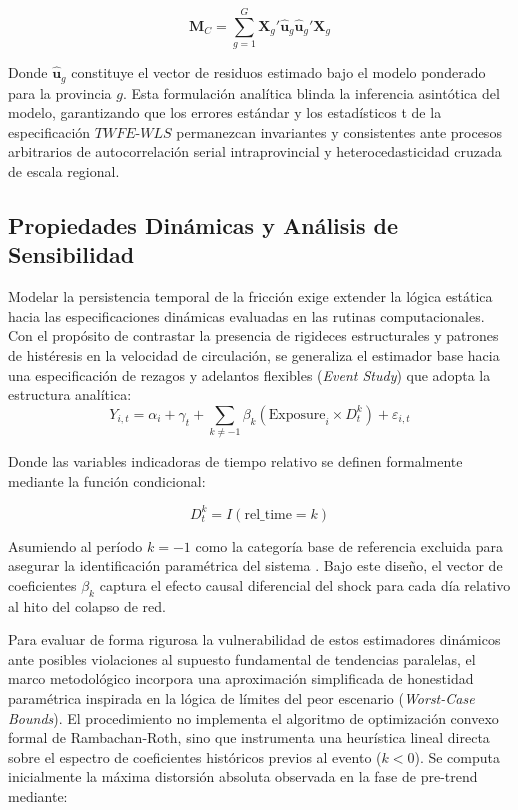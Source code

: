 \begin{equation}
    \mathbf{M}_C = \sum_{g=1}^{G} \mathbf{X}_g' \hat{\mathbf{u}}_g \hat{\mathbf{u}}_g' \mathbf{X}_g
\end{equation}

Donde $\hat{\mathbf{u}}_g$ constituye el vector de residuos estimado bajo el modelo ponderado para la provincia $g$. Esta formulaci\'on anal\'itica blinda la inferencia asint\'otica del modelo, garantizando que los errores est\'andar y los estad\'isticos t de la especificaci\'on $TWFE\text{-}WLS$ permanezcan invariantes y consistentes ante procesos arbitrarios de autocorrelaci\'on serial intraprovincial y heterocedasticidad cruzada de escala regional.

\subsection{Propiedades Din\'amicas y An\'alisis de Sensibilidad}
\label{sec:A_3}

Modelar la persistencia temporal de la fricci\'on exige extender la l\'ogica est\'atica hacia las especificaciones din\'amicas evaluadas en las rutinas computacionales. Con el prop\'osito de contrastar la presencia de rigideces estructurales y patrones de hist\'eresis en la velocidad de circulaci\'on, se generaliza el estimador base hacia una especificaci\'on de rezagos y adelantos flexibles (\textit{Event Study}) \citep{schmidheiny2019event} que adopta la estructura anal\'itica:
\begin{equation}
    Y_{i,t} = \alpha_i + \gamma_t + \sum_{k \neq -1} \beta_k \left( \text{Exposure}_i \times D_t^k \right) + \varepsilon_{i,t}
    \label{eq:event_study}
\end{equation}

Donde las variables indicadoras de tiempo relativo se definen formalmente mediante la funci\'on condicional:

\begin{equation}
    D_t^k = \textit{$I$}(\text{rel\_time} = k)
\end{equation}

Asumiendo al per\'iodo $k = -1$ como la categor\'ia base de referencia excluida para asegurar la identificaci\'on param\'etrica del sistema \citep{angrist2009mostly}. Bajo este dise\~no, el vector de coeficientes $\beta_k$ captura el efecto causal diferencial del shock para cada d\'ia relativo al hito del colapso de red.

Para evaluar de forma rigurosa la vulnerabilidad de estos estimadores din\'amicos ante posibles violaciones al supuesto fundamental de tendencias paralelas, el marco metodol\'ogico incorpora una aproximaci\'on simplificada de honestidad param\'etrica inspirada en la l\'ogica de l\'imites del peor escenario (\textit{Worst-Case Bounds}). El procedimiento no implementa el algoritmo de optimizaci\'on convexo formal de Rambachan-Roth, sino que instrumenta una heur\'istica lineal directa sobre el espectro de coeficientes hist\'oricos previos al evento ($k < 0$). Se computa inicialmente la m\'axima distorsi\'on absoluta observada en la fase de pre-trend mediante:

